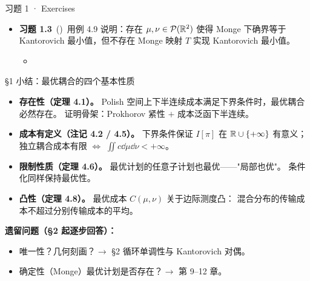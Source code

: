 \begin{frame}{习题 1 · Exercises}
\begin{itemize}
    \item \textbf{习题 1.3}~(\diffIII)\ 用例 4.9 说明：存在 $\mu,\nu\in\mathcal{P}(\mathbb{R}^2)$ 使得
      Monge 下确界等于 Kantorovich 最小值，但不存在 Monge 映射 $T$ 实现 Kantorovich 最小值。
      \begin{itemize}\footnotesize
        \item {}
      \end{itemize}
  \end{itemize}
\end{frame}

\begin{frame}{§1 小结：最优耦合的四个基本性质}
  \begin{itemize}\small
    \item \textbf{存在性（定理 4.1）。} Polish 空间上下半连续成本满足下界条件时，最优耦合必然存在。
      证明骨架：Prokhorov 紧性 $+$ 成本泛函下半连续。
    \item \textbf{成本有定义（注记 4.2 / 4.5）。} 下界条件保证 $I[\pi]$ 在 $\mathbb{R}\cup\{+\infty\}$ 有意义；
      独立耦合成本有限 $\iff$ $\iint c\dd\mu\dd\nu<+\infty$。
    \item \textbf{限制性质（定理 4.6）。} 最优计划的任意子计划也最优——"局部也优"。
      条件化同样保持最优性。
    \item \textbf{凸性（定理 4.8）。} 最优成本 $C(\mu,\nu)$ 关于边际测度凸：
      混合分布的传输成本不超过分别传输成本的平均。
  \end{itemize}
  \textbf{遗留问题（§2 起逐步回答）：}
  \begin{itemize}\small
    \item 唯一性？几何刻画？$\to$ §2 循环单调性与 Kantorovich 对偶。
    \item 确定性（Monge）最优计划是否存在？$\to$ 第 9--12 章。
  \end{itemize}
\end{frame}
